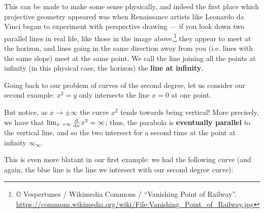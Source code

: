 \documentclass[a4paper,leqno,10pt]{article}
\theoremstyle{exercise}
\theoremstyle{plain}
\theoremstyle{definition}
\theoremstyle{remark}
\newcommand{\df}{\textbf}
\begin{document}
This can be made to make some sense physically, and indeed the first place which projective geometry appeared was when Renaissance artists
like Leonardo da Vinci began to experiment with perspective drawing --- if you look down two parallel lines in real life, like those in the
image above,\footnote{© Vespertunes / Wikimedia Commons / ``Vanishing Point of Railway''. \url{https://commons.wikimedia.org/wiki/File:Vanishing_Point_of_Railway.jpg}}
they appear to meet at the horizon, and lines going in the same direction away from you (i.e. lines with the same slope) meet
at the same point. We call the line joining all the points at infinity (in this physical case, the horizon) the \df{line at infinity}.

Going back to our problem of curves of the second degree, let us consider our second example: $ x^2 = y $ only intersects the line $ x = 0 $
at one point.

\begin{center}
\end{center}

But notice, as $ x \to \pm \infty $ the curve $ x^2 $ tends towards being vertical! More precisely, we have
that $ \lim_{x \to \infty} \od{}{x} x^2 = \infty $; thus, the parabola is \df{eventually parallel} to the
vertical line, and so the two intersect for a second time at the point at infinity $ \infty_\infty $.

This is even more blatant in our first example: we had the following curve (and again, the blue line is the
line we intersect with our second degree curve):

\begin{center}
\end{center}
\end{document}
